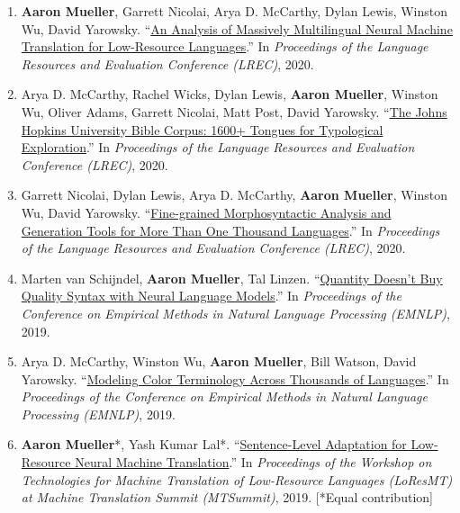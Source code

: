 \documentclass[10pt]{article}
\newcommand{\halfblankline}{\quad\vspace{-0.5\baselineskip}\pagebreak[3]}
\providecommand*\titlelink[2]{\href{#1}{\textcolor{accent}{#2}}}
\begin{document}
\begin{enumerate}[leftmargin=*, topsep=0pt, itemsep=0.25ex, partopsep=0ex, parsep=1ex]
	\item \textbf{Aaron Mueller}, Garrett Nicolai, Arya D. McCarthy, Dylan Lewis, Winston Wu, David Yarowsky. ``\titlelink{https://aclanthology.org/2020.lrec-1.458/}{An Analysis of Massively Multilingual Neural Machine Translation for Low-Resource Languages}.'' In \emph{Proceedings of the Language Resources and Evaluation Conference (LREC)}, 2020.

	\item Arya D. McCarthy, Rachel Wicks, Dylan Lewis, \textbf{Aaron Mueller}, Winston Wu, Oliver Adams, Garrett Nicolai, Matt Post, David Yarowsky. ``\titlelink{https://aclanthology.org/2020.lrec-1.352/}{The Johns Hopkins University Bible Corpus: 1600+ Tongues for Typological Exploration}.'' In \emph{Proceedings of the Language Resources and Evaluation Conference (LREC)}, 2020.

	\item Garrett Nicolai, Dylan Lewis, Arya D. McCarthy, \textbf{Aaron Mueller}, Winston Wu, David Yarowsky. ``\titlelink{https://aclanthology.org/2020.lrec-1.488/}{Fine-grained Morphosyntactic Analysis and Generation Tools for More Than One Thousand Languages}.'' In \emph{Proceedings of the Language Resources and Evaluation Conference (LREC)}, 2020.

	\item Marten van Schijndel, \textbf{Aaron Mueller}, Tal Linzen. ``\titlelink{https://aclanthology.org/D19-1592/}{Quantity Doesn't Buy Quality Syntax with Neural Language Models}.'' In \emph{Proceedings of the Conference on Empirical Methods in Natural Language Processing (EMNLP)}, 2019.

	\item Arya D. McCarthy, Winston Wu, \textbf{Aaron Mueller}, Bill Watson, David Yarowsky. ``\titlelink{https://aclanthology.org/D19-1229/}{Modeling Color Terminology Across Thousands of Languages}.'' In \emph{Proceedings of the Conference on Empirical Methods in Natural Language Processing (EMNLP)}, 2019.

	\item \textbf{Aaron Mueller}*, Yash Kumar Lal*. ``\titlelink{https://aclanthology.org/W19-6807/}{Sentence-Level Adaptation for Low-Resource Neural Machine Translation}.'' In \emph{Proceedings of the Workshop on Technologies for Machine Translation of Low-Resource Languages (LoResMT) at Machine Translation Summit (MTSummit)}, 2019. [*Equal contribution]\label{pub:sent-level}
	\end{enumerate}

	\halfblankline
\end{document}
